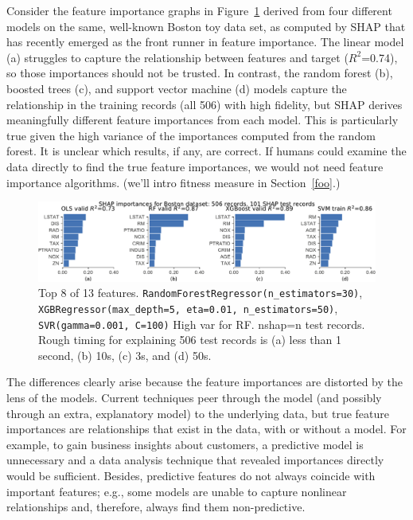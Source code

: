 \documentclass[12pt]{article}
\newcommand{\secref}[1]{Section~\ref{#1}}
\newcommand{\figref}[1]{Figure~\ref{#1}}
\newcommand{\todo}[1]{{{\color{red}{[#1]}}}}
\begin{document}
Consider the feature importance graphs in \figref{fig:diff-models} derived from four different models on the same, well-known Boston toy data set, as computed by SHAP \cite{shap} that has recently emerged as the front runner in feature importance. The linear model (a) struggles to capture the relationship between features and target ($R^2$=0.74), so those importances should not be trusted.  In contrast, the random forest (b), boosted trees (c), and support vector machine (d) models capture the relationship in the training records (all 506) with high fidelity, but SHAP derives meaningfully different feature importances from each model.  This is particularly true given the high variance of the importances computed from the random forest. \todo{explain that} It is unclear which results, if any, are correct. If humans could examine the data directly to find the true feature importances, we would not need feature importance algorithms. (we'll intro fitness measure in \secref{foo}.)

\begin{figure}[htbp]
\begin{center}
\includegraphics[scale=0.6]{images/diff-models.pdf}
\caption{Top 8 of 13 features. {\tt\footnotesize RandomForestRegressor(n\_estimators=30)}, {\tt\footnotesize XGBRegressor(max\_depth=5, eta=0.01, n\_estimators=50)}, {\tt\footnotesize SVR(gamma=0.001, C=100)} High var for RF. nshap=n test records. Rough timing for explaining 506 test records is (a) less than 1 second, (b) 10s, (c) 3s, and (d) 50s.}
\label{fig:diff-models}
\end{center}
\end{figure}

The differences clearly arise because the feature importances are distorted by the lens of the models. Current techniques peer through the model (and possibly through an extra, explanatory model) to the underlying data, but true feature importances are relationships that exist in the data, with or without a model.  For example, to gain business insights about customers, a predictive model is unnecessary and a data analysis technique that revealed importances directly would be sufficient. \todo{maybe say PCA does this although limited to linear features and assumes most spread = most important?} Besides, predictive features do not always coincide with important features; e.g., some models are unable to capture nonlinear relationships and, therefore, always find them non-predictive.  \todo{last bit redundant?}
 
\end{document}
